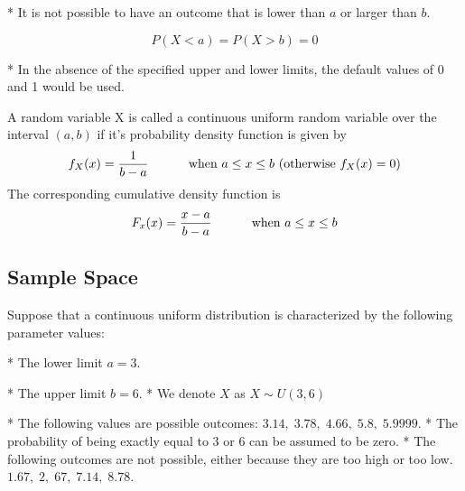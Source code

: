 \documentclass[a4paper,12pt]{article}
\begin{document}
* It is not possible to have an outcome that is lower than $a$ or larger than $b$.

\[ P(X < a) = P(X > b) = 0\] 

* In the absence of the specified upper and lower limits, the default values of 0 and 1 would be used.







\begin{framed}
\noindent A random variable X is called a continuous uniform random variable over the interval $(a,b)$ if it's probability density function is given by
\[ f_{X}(x) = { 1 \over b-a} \hspace{1cm} \mbox{ when } a \leq x \leq b \mbox{     (otherwise } f_X(x) = 0 ) \]
The corresponding cumulative density function is
\[ F_x(x) = { x-a \over b-a} \hspace{1cm} \mbox{ when } a \leq x \leq b\]




\subsection*{Sample Space}
\noindent Suppose that a continuous uniform distribution is characterized by the following parameter values:

* The lower limit $a = 3$. %

* The upper limit $b = 6$. %
* We denote $X$ as $X \sim U(3,6)$




% 
%  

*  The following values are possible outcomes: $3.14, \;3.78,\; 4.66,\; 5.8,\;5.9999.$ \smallskip
*  The probability of being exactly equal to $3$ or $6$ can be assumed to be zero. \smallskip
*  The following outcomes are not possible, either because they are too high or too low.
$1.67,\;2,\;67,\;7.14,\; 8.78.$


\end{framed}
\end{document}
